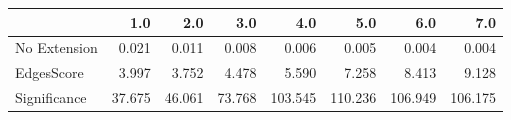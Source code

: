 \begin{tabular}{lrrrrrrr}
\toprule
{} &    1.0 &    2.0 &    3.0 &     4.0 &     5.0 &     6.0 &     7.0 \\
\midrule
No Extension &  0.021 &  0.011 &  0.008 &   0.006 &   0.005 &   0.004 &   0.004 \\
EdgesScore   &  3.997 &  3.752 &  4.478 &   5.590 &   7.258 &   8.413 &   9.128 \\
Significance & 37.675 & 46.061 & 73.768 & 103.545 & 110.236 & 106.949 & 106.175 \\
\bottomrule
\end{tabular}
